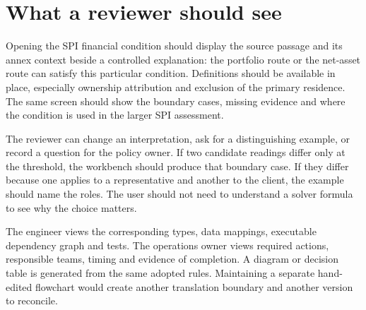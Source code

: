 \documentclass[12pt,a4paper,oneside,openany]{book}
\begin{document}

\section{What a reviewer should see}
\label{merge:P-03-product:01}


Opening the SPI financial condition should display the source passage and its
annex context beside a controlled explanation: the portfolio route or the
net-asset route can satisfy this particular condition. Definitions should be
available in place, especially ownership attribution and exclusion of the primary
residence. The same screen should show the boundary cases, missing evidence and
where the condition is used in the larger SPI assessment.

The reviewer can change an interpretation, ask for a distinguishing example, or
record a question for the policy owner. If two candidate readings differ only at
the threshold, the workbench should produce that boundary case. If they differ
because one applies to a representative and another to the client, the example
should name the roles. The user should not need to understand a solver formula
to see why the choice matters.

The engineer views the corresponding types, data mappings, executable dependency
graph and tests. The operations owner views required actions, responsible teams,
timing and evidence of completion. A diagram or decision table is generated from
the same adopted rules. Maintaining a separate hand-edited flowchart would create
another translation boundary and another version to reconcile.
\end{document}
